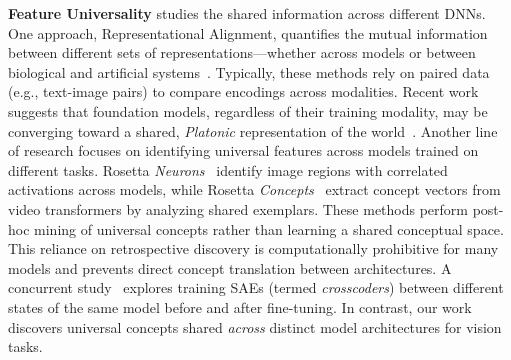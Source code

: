 \noindent\textbf{Feature Universality} studies the shared information across different DNNs. One approach, Representational Alignment, quantifies the mutual information between different sets of representations—whether across models or between biological and artificial systems~\cite{kriegeskorte2008representational,sucholutsky2023getting}. Typically, these methods rely on paired data (e.g., text-image pairs) to compare encodings across modalities. Recent work suggests that foundation models, regardless of their training modality, may be converging toward a shared, \textit{Platonic} representation of the world~\cite{huh2024platonic}. Another line of research focuses on identifying universal features across models trained on different tasks. Rosetta \textit{Neurons}~\cite{dravid2023rosetta} identify image regions with correlated activations across models, while Rosetta \textit{Concepts}~\cite{kowal2024understanding} extract concept vectors from video transformers by analyzing shared exemplars. These methods perform post-hoc mining of universal concepts rather than learning a shared conceptual space. This reliance on retrospective discovery is computationally prohibitive for many models and prevents direct concept translation between architectures.  
A concurrent study~\cite{lindsey2024sparse} explores training SAEs (termed \textit{crosscoders}) between different states of the same model before and after fine-tuning. In contrast, our work discovers universal concepts shared \textit{across} distinct model architectures for vision tasks.





